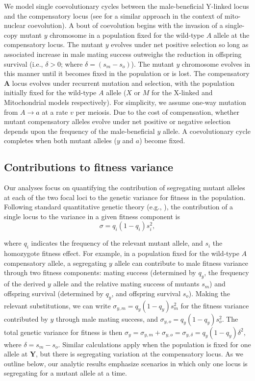 \documentclass{article}
\begin{document}
We model single coevolutionary cycles between the male-beneficial Y-linked locus and the compensatory locus (see \citealt{ConnallonDowling2017} for a similar approach in the context of mito-nuclear coevolution). A bout of coevolution begins with the invasion of a single-copy mutant $y$ chromosome in a population fixed for the wild-type $A$ allele at the compensatory locus. The mutant $y$ evolves under net positive selection so long as associated increase in male mating success outweighs the reduction in offspring survival (i.e., $\delta > 0$; where $\delta = (s_m - s_o)$). The mutant $y$ chromosome evolves in this manner until it becomes fixed in the population or is lost. The compensatory $\mathbf{A}$ locus evolves under recurrent mutation and selection, with the population initially fixed for the wild-type $A$ allele ($X$ or $M$ for the X-linked and Mitochondrial models respectively). For simplicity, we assume one-way mutation from $A \rightarrow a$ at a rate $v$ per meiosis. Due to the cost of compensation, whether mutant compensatory alleles evolve under net positive or negative selection depends upon the frequency of the male-beneficial $y$ allele. A coevolutionary cycle completes when both mutant alleles ($y$ and $a$) become fixed.



\subsection{Contributions to fitness variance} \label{subsec:variances}

Our analyses focus on quantifying the contribution of segregating mutant alleles at each of the two focal loci to the genetic variance for fitness in the population. Following standard quantitative genetic theory (e.g., \citealt{James1973,LynchWalsh1998}), the contribution of a single locus to the variance in a given fitness component is 
\begin{equation} \label{eq:fitnessVariance}
	\sigma = q_{i}(1 - q_{i})s_{i}^{2},
\end{equation}

\noindent where $q_i$ indicates the frequency of the relevant mutant allele, and $s_i$ the homozygote fitness effect. For example, in a population fixed for the wild-type $A$ compensatory allele, a segregating $y$ allele can contribute to male fitness variance through two fitness components: mating success (determined by $q_y$, the frequency of the derived $y$ allele and the relative mating success of mutants $s_m$) and offspring survival (determined by $q_y$, and offspring survival $s_o$). Making the relevant substitutions, we can write $\sigma_{y,m} = q_{y}(1 - q_{y})s_{m}^{2}$ for the fitness variance contributed by $y$ through male mating success, and $\sigma_{y,o} = q_{y}(1 - q_{y})s_{o}^{2}$. The total genetic variance for fitness is then $\sigma_{y} = \sigma_{y,m} + \sigma_{y,o} = \sigma_{y,\delta} = q_{y}(1 - q_{y})\delta^{2}$, where $\delta = s_m - s_o$. Similar calculations apply when the population is fixed for one allele at $\mathbf{Y}$, but there is segregating variation at the compensatory locus. As we outline below, our analytic results emphasize scenarios in which only one locus is segregating for a mutant allele at a time.
\end{document}
